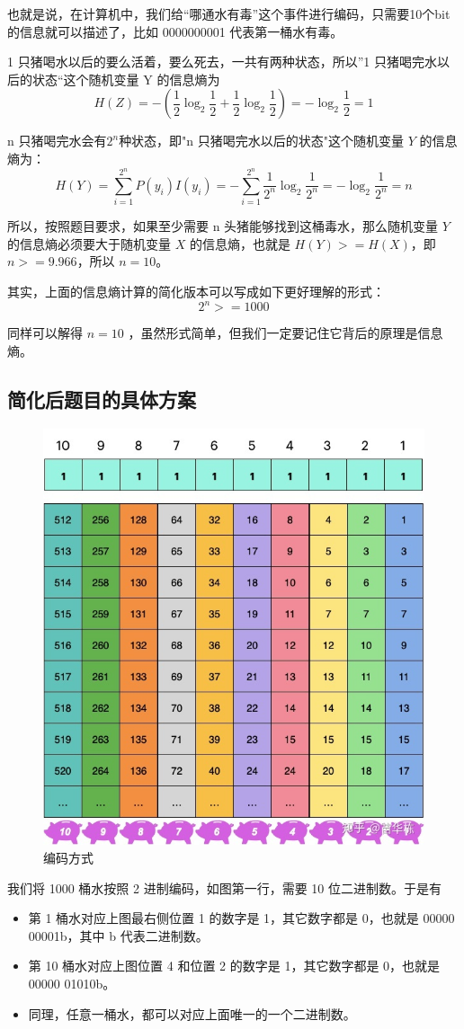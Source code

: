 \documentclass[12pt]{article}
\begin{document}
也就是说，在计算机中，我们给“哪通水有毒”这个事件进行编码，只需要10个bit的信息就可以描述了，比如 0000000001 代表第一桶水有毒。

1 只猪喝水以后的要么活着，要么死去，一共有两种状态，所以”1 只猪喝完水以后的状态“这个随机变量 Y 的信息熵为
$$H(Z) = -(\frac{1}{2}\log_2{\frac{1}{2}}+\frac{1}{2}\log_2{\frac{1}{2}}) = -\log_2{\frac{1}{2}} = 1$$

n 只猪喝完水会有$2^n$种状态，即"n 只猪喝完水以后的状态"这个随机变量 $Y$ 的信息熵为：
$$H(Y) = \sum_{i=1}^{2^n}P(y_i)I(y_i)=-\sum_{i=1}^{2^n}\frac{1}{2^n}\log_2{\frac{1}{2^n}} = -\log_2{\frac{1}{2^n}} = n$$

所以，按照题目要求，如果至少需要 n 头猪能够找到这桶毒水，那么随机变量 $Y$ 的信息熵必须要大于随机变量 $X$ 的信息熵，也就是 $H(Y)>=H(X)$，即$n>=9.966$，所以 $n=10$。

其实，上面的信息熵计算的简化版本可以写成如下更好理解的形式：
$$2^n>=1000$$

同样可以解得 $n = 10$ ，虽然形式简单，但我们一定要记住它背后的原理是信息熵。

\subsection{简化后题目的具体方案}
\begin{figure}[ht]
  \centering
  \includegraphics[width=.5\textwidth]{fig/InfomationTheory_Poison_Encode.jpg} %
  \caption{编码方式} %
  \label{InfomationTheory_Poison_Encode} %
\end{figure}
我们将 1000 桶水按照 2 进制编码，如图第一行，需要 10 位二进制数。于是有

\begin{itemize}[itemindent=2em]
    \item 第 1 桶水对应上图最右侧位置 1 的数字是 1，其它数字都是 0，也就是 00000 00001b，其中 b 代表二进制数。
    
    \item 第 10 桶水对应上图位置 4 和位置 2 的数字是 1，其它数字都是 0，也就是 00000 01010b。
    
    \item 同理，任意一桶水，都可以对应上面唯一的一个二进制数。
\end{itemize}
\end{document}
